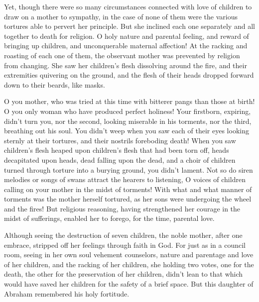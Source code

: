  Yet, though there were so many circumstances connected
with love of children to draw on a mother to sympathy, in the case of
none of them were the various tortures able to pervert her principle.
 But she inclined each one separately and all together to
death for religion.  O holy nature and parental feeling,
and reward of bringing up children, and unconquerable maternal
affection!  At the racking and roasting of each one of
them, the observant mother was prevented by religion from changing.
 She saw her children's flesh dissolving around the fire,
and their extremities quivering on the ground, and the flesh of their
heads dropped forward down to their beards, like masks.

 O you mother, who was tried at this time with bitterer
pangs than those at birth!  O you only woman who have
produced perfect holiness!  Your firstborn, expiring,
didn't turn you, nor the second, looking miserable in his torments, nor
the third, breathing out his soul.  You didn't weep when
you saw each of their eyes looking sternly at their tortures, and their
nostrils foreboding death!  When you saw children's flesh
heaped upon children's flesh that had been torn off, heads decapitated
upon heads, dead falling upon the dead, and a choir of children turned
through torture into a burying ground, you didn't lament.
 Not so do siren melodies or songs of swans attract the
hearers to listening, O voices of children calling on your mother in the
midst of torments!  With what and what manner of torments
was the mother herself tortured, as her sons were undergoing the wheel
and the fires!  But religious reasoning, having
strengthened her courage in the midst of sufferings, enabled her to
forego, for the time, parental love.

 Although seeing the destruction of seven children, the
noble mother, after one embrace, stripped off her feelings through faith
in God.  For just as in a council room, seeing in her own
soul vehement counselors, nature and parentage and love of her children,
and the racking of her children,  she holding two votes,
one for the death, the other for the preservation of her children,
 didn't lean to that which would have saved her children
for the safety of a brief space.  But this daughter of
Abraham remembered his holy fortitude.


